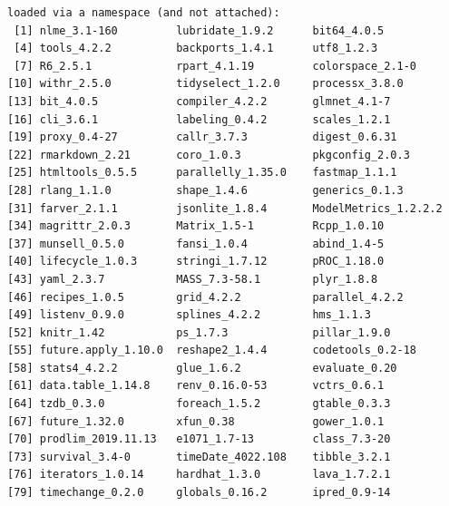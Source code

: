 \documentclass[
  letterpaper,
  DIV=11,
  numbers=noendperiod]{scrartcl}
\begin{document}
\begin{tcolorbox}
\begin{verbatim}
loaded via a namespace (and not attached):
 [1] nlme_3.1-160         lubridate_1.9.2      bit64_4.0.5         
 [4] tools_4.2.2          backports_1.4.1      utf8_1.2.3          
 [7] R6_2.5.1             rpart_4.1.19         colorspace_2.1-0    
[10] withr_2.5.0          tidyselect_1.2.0     processx_3.8.0      
[13] bit_4.0.5            compiler_4.2.2       glmnet_4.1-7        
[16] cli_3.6.1            labeling_0.4.2       scales_1.2.1        
[19] proxy_0.4-27         callr_3.7.3          digest_0.6.31       
[22] rmarkdown_2.21       coro_1.0.3           pkgconfig_2.0.3     
[25] htmltools_0.5.5      parallelly_1.35.0    fastmap_1.1.1       
[28] rlang_1.1.0          shape_1.4.6          generics_0.1.3      
[31] farver_2.1.1         jsonlite_1.8.4       ModelMetrics_1.2.2.2
[34] magrittr_2.0.3       Matrix_1.5-1         Rcpp_1.0.10         
[37] munsell_0.5.0        fansi_1.0.4          abind_1.4-5         
[40] lifecycle_1.0.3      stringi_1.7.12       pROC_1.18.0         
[43] yaml_2.3.7           MASS_7.3-58.1        plyr_1.8.8          
[46] recipes_1.0.5        grid_4.2.2           parallel_4.2.2      
[49] listenv_0.9.0        splines_4.2.2        hms_1.1.3           
[52] knitr_1.42           ps_1.7.3             pillar_1.9.0        
[55] future.apply_1.10.0  reshape2_1.4.4       codetools_0.2-18    
[58] stats4_4.2.2         glue_1.6.2           evaluate_0.20       
[61] data.table_1.14.8    renv_0.16.0-53       vctrs_0.6.1         
[64] tzdb_0.3.0           foreach_1.5.2        gtable_0.3.3        
[67] future_1.32.0        xfun_0.38            gower_1.0.1         
[70] prodlim_2019.11.13   e1071_1.7-13         class_7.3-20        
[73] survival_3.4-0       timeDate_4022.108    tibble_3.2.1        
[76] iterators_1.0.14     hardhat_1.3.0        lava_1.7.2.1        
[79] timechange_0.2.0     globals_0.16.2       ipred_0.9-14        
\end{verbatim}

\end{tcolorbox}
\end{document}
